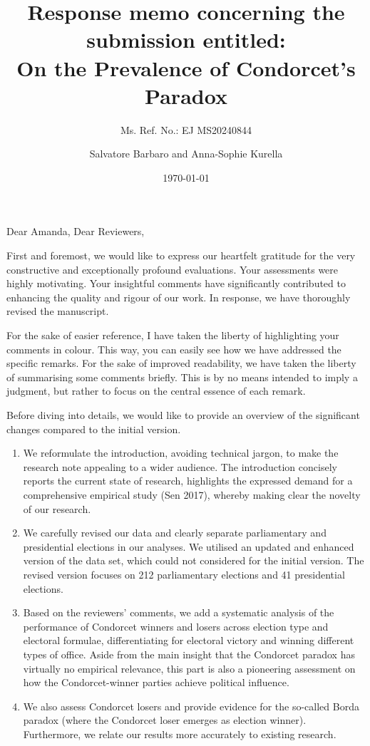 \documentclass[a4paper, 12pt]{scrartcl}
\title{{\small Response memo concerning the submission entitled:} \\ On the Prevalence of Condorcet's Paradox }
\subtitle{Ms. Ref. No.: EJ MS20240844}
\author{Salvatore Barbaro and Anna-Sophie Kurella}
\date{\today}
\theoremstyle{break}
\begin{document}
\maketitle

\linenumbers

\noindent Dear Amanda, Dear Reviewers,


First and foremost, we would like to express our heartfelt gratitude for the very constructive and exceptionally profound evaluations. Your assessments were highly motivating. Your insightful comments have significantly contributed to enhancing the quality and rigour of our work. In response, we have thoroughly revised the manuscript.

For the sake of easier reference, I have taken the liberty of highlighting your comments in colour. This way, you can easily see how we have addressed the specific remarks. For the sake of improved readability, we have taken the liberty of summarising some comments briefly. This is by no means intended to imply a judgment, but rather to focus on the central essence of each remark.

Before diving into details, we would like to provide an overview of the significant changes compared to the initial version.
\begin{enumerate}
 \item We reformulate the introduction, avoiding technical jargon, to make the research note appealing to a wider audience. The introduction concisely reports the current state of research, highlights the expressed demand for a comprehensive empirical study (Sen 2017), whereby making clear the novelty of our research.
\item We carefully revised our data and clearly separate parliamentary and presidential elections in our analyses. We utilised an updated and enhanced version of the data set, which could not considered for the initial version. The revised version focuses on 212 parliamentary elections and 41 presidential elections. 
\item Based on the reviewers' comments, we add a systematic analysis of the performance of Condorcet winners and losers across election type and electoral formulae, differentiating for electoral victory and winning different types of office. Aside from the main insight that the Condorcet paradox has virtually no empirical relevance, this part is also a pioneering assessment on how the Condorcet-winner parties achieve political influence. 
\item We also assess Condorcet losers and provide evidence for the so-called Borda paradox (where the Condorcet loser emerges as election winner). Furthermore, we relate our results more accurately to existing research.
\end{enumerate}
\end{document}
